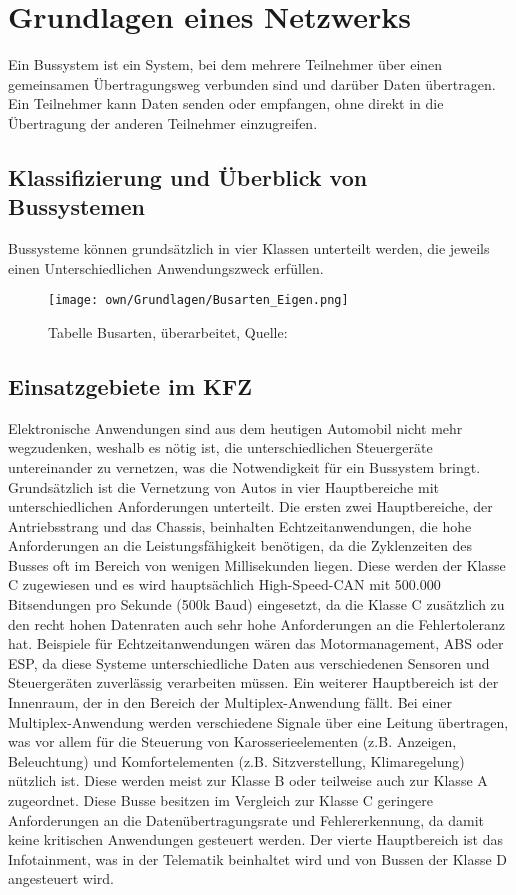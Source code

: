 
\chapter{Grundlagen eines Netzwerks}



Ein Bussystem ist ein System, bei dem mehrere Teilnehmer über einen gemeinsamen Übertragungsweg verbunden sind und darüber Daten übertragen.
Ein Teilnehmer kann Daten senden oder empfangen, ohne direkt in die Übertragung der anderen Teilnehmer einzugreifen.


\section{Klassifizierung und Überblick von Bussystemen}
Bussysteme können grundsätzlich in vier Klassen unterteilt werden, die jeweils einen Unterschiedlichen Anwendungszweck erfüllen.
\begin{figure}[!htbp]
    \centering
    \texttt{[image: own/Grundlagen/Busarten\_Eigen.png]}
    \caption{Tabelle Busarten, überarbeitet, Quelle: \cite{BAA2011, S.82}}
    \label{fig:Busarten}
\end{figure}
    
\section{Einsatzgebiete im KFZ}
Elektronische Anwendungen sind aus dem heutigen Automobil nicht mehr wegzudenken, weshalb es nötig ist, die unterschiedlichen Steuergeräte untereinander zu vernetzen, was die Notwendigkeit für ein Bussystem bringt.
Grundsätzlich ist die Vernetzung von Autos in vier Hauptbereiche mit unterschiedlichen Anforderungen unterteilt.
Die ersten zwei Hauptbereiche, der Antriebsstrang und das Chassis, beinhalten Echtzeitanwendungen, die hohe Anforderungen an die Leistungsfähigkeit benötigen, da die Zyklenzeiten des Busses oft im Bereich von wenigen Millisekunden liegen.
Diese werden der Klasse C zugewiesen und es wird hauptsächlich High-Speed-\ac{CAN} mit 500.000 Bitsendungen pro Sekunde (500k Baud) eingesetzt, da die Klasse C zusätzlich zu den recht hohen Datenraten auch sehr hohe Anforderungen an die Fehlertoleranz hat.
Beispiele für Echtzeitanwendungen wären das Motormanagement, \ac{ABS} oder \ac{ESP}, da diese Systeme unterschiedliche Daten aus verschiedenen Sensoren und Steuergeräten zuverlässig verarbeiten müssen.
Ein weiterer Hauptbereich ist der Innenraum, der in den Bereich der Multiplex-Anwendung fällt.
Bei einer Multiplex-Anwendung werden verschiedene Signale über eine Leitung übertragen, was vor allem für die Steuerung von Karosserieelementen (z.B. Anzeigen, Beleuchtung) und Komfortelementen (z.B. Sitzverstellung, Klimaregelung) nützlich ist.
Diese werden meist zur Klasse B oder teilweise auch zur Klasse A zugeordnet. Diese Busse besitzen im Vergleich zur Klasse C geringere Anforderungen an die Datenübertragungsrate und Fehlererkennung, da damit keine kritischen Anwendungen gesteuert werden.
Der vierte Hauptbereich ist das Infotainment, was in der Telematik beinhaltet wird und von Bussen der Klasse D angesteuert wird.

